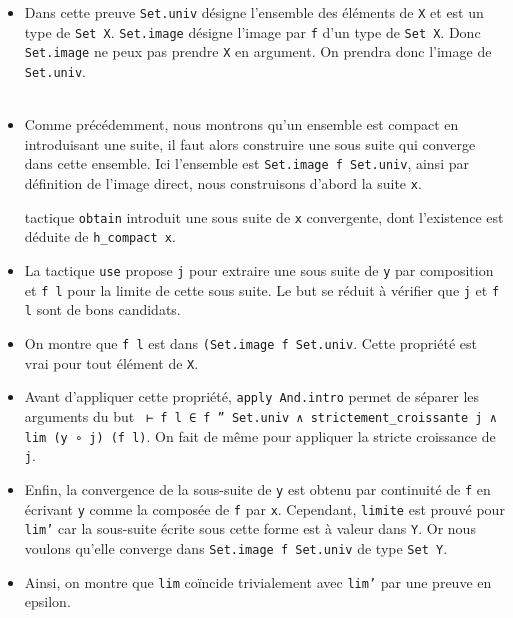 \documentclass[a4paper, 12pt]{article}
\newcommand{\lean}[1]{\texttt{#1}}
\begin{document}
\begin{itemize}
    \item Dans cette preuve \lean{Set.univ} désigne l'ensemble des éléments de \lean{X} et est un type de \lean{Set X}. \lean{Set.image} désigne l'image par \lean{f} d'un type de \lean{Set X}. Donc \lean{Set.image} ne peux pas prendre \lean{X} en argument. On prendra donc l'image de \lean{Set.univ}.\\\\

    \item Comme précédemment, nous montrons qu'un ensemble est compact en introduisant une suite, il faut alors construire une sous suite qui converge dans cette ensemble. Ici l'ensemble est \lean{Set.image f Set.univ}, ainsi par définition de l'image direct, nous construisons d'abord la suite \lean{x}.

    \itemLa tactique \lean{obtain} introduit une sous suite de \lean{x} convergente, dont l'existence est déduite de \lean{h_compact x}.

    \item La tactique \lean{use} propose \lean{j} pour extraire une sous suite de \lean{y} par composition et \lean{f l} pour la limite de cette sous suite. Le but se réduit à vérifier que \lean{j} et \lean{f l} sont de bons candidats.

    \item On montre que \lean{f l} est dans \lean{(Set.image f Set.univ}. Cette propriété est vrai pour tout élément de \lean{X}. 

    \item Avant d'appliquer cette propriété, \lean{apply And.intro} permet de séparer les arguments du but \lean{ ⊢ f l ∈ f '' Set.univ ∧ strictement_croissante j ∧ lim (y ∘ j) (f l)}. On fait de même pour appliquer la stricte croissance de \lean{j}. 

    \item Enfin, la convergence de la sous-suite de \lean{y} est obtenu par continuité de \lean{f} en écrivant \lean{y} comme la composée de \lean{f} par \lean{x}. Cependant, \lean{limite} est prouvé pour \lean{lim'} car la sous-suite écrite sous cette forme est à valeur dans \lean{Y}. Or nous voulons qu'elle converge dans \lean{Set.image f Set.univ} de type \lean{Set Y}.

    \item Ainsi, on montre que \lean{lim} coïncide trivialement avec \lean{lim'} par une preuve en epsilon.

\vspace{\baselineskip}


\end{itemize}
\end{document}
